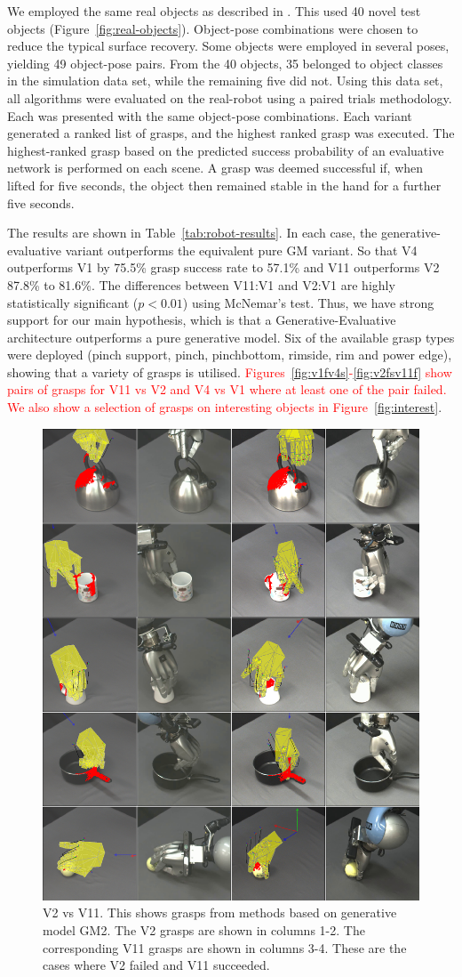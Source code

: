 We employed the same real objects as described in \cite{kopicki2019ijrr}. This used 40 novel test objects (Figure~\ref{fig:real-objects}). Object-pose combinations were chosen to reduce the typical surface recovery. Some objects were employed in several poses, yielding 49 object-pose pairs. From the 40 objects, 35 belonged to object classes in the simulation data set, while the remaining five did not. Using this data set, all algorithms were evaluated on the real-robot using a paired trials methodology. Each was presented with the same object-pose combinations. Each variant generated a ranked list of grasps, and the highest ranked grasp was executed. The highest-ranked grasp based on the predicted success probability of an evaluative network is performed on each scene. A grasp was deemed successful if, when lifted for five seconds, the object then remained stable in the hand for a further five seconds.

The results are shown in Table~\ref{tab:robot-results}. In each case, the generative-evaluative variant outperforms the equivalent pure GM variant. So that V4 outperforms V1 by 75.5\% grasp success rate to 57.1\% and V11 outperforms V2 87.8\% to 81.6\%. The differences between V11:V1 and V2:V1 are highly statistically significant ($p<0.01$) using McNemar's test. Thus, we have strong support for our main hypothesis, which is that a Generative-Evaluative architecture outperforms a pure generative model. Six of the available grasp types were deployed (pinch support, pinch, pinchbottom, rimside, rim and power edge), showing that a variety of grasps is utilised. \textcolor{red}{Figures~\ref{fig:v1fv4s}-\ref{fig:v2fsv11f} show pairs of grasps for V11 vs V2  and V4 vs V1 where at least one of the pair failed. We also show a selection of grasps on interesting objects in Figure~\ref{fig:interest}}.

\begin{figure}[t]
\begin{center}
\includegraphics[width=0.5\columnwidth]{plots/A6fA10s_vertical.png}
\caption{V2 vs V11. This shows grasps from methods based on generative model GM2. The V2 grasps are shown in columns 1-2. The corresponding V11 grasps are shown in columns 3-4. These are the cases where V2 failed and V11 succeeded. \label{fig:v2fv11s}}
\end{center}
\end{figure}

